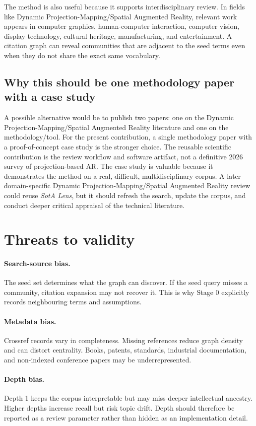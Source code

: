 \documentclass[11pt,a4paper]{article}
\newcommand{\tool}{\emph{SotA Lens}}
\newcommand{\dpm}{Dynamic Projection-Mapping}
\newcommand{\sar}{Spatial Augmented Reality}
\begin{document}
The method is also useful because it supports interdisciplinary review. In fields like \dpm{}/\sar{}, relevant work appears in computer graphics, human-computer interaction, computer vision, display technology, cultural heritage, manufacturing, and entertainment. A citation graph can reveal communities that are adjacent to the seed terms even when they do not share the exact same vocabulary.

\subsection{Why this should be one methodology paper with a case study}

A possible alternative would be to publish two papers: one on the \dpm{}/\sar{} literature and one on the methodology/tool. For the present contribution, a single methodology paper with a proof-of-concept case study is the stronger choice. The reusable scientific contribution is the review workflow and software artifact, not a definitive 2026 survey of projection-based AR. The case study is valuable because it demonstrates the method on a real, difficult, multidisciplinary corpus. A later domain-specific \dpm{}/\sar{} review could reuse \tool{}, but it should refresh the search, update the corpus, and conduct deeper critical appraisal of the technical literature.

\section{Threats to validity}

\paragraph{Search-source bias.}
The seed set determines what the graph can discover. If the seed query misses a community, citation expansion may not recover it. This is why Stage 0 explicitly records neighbouring terms and assumptions.

\paragraph{Metadata bias.}
Crossref records vary in completeness. Missing references reduce graph density and can distort centrality. Books, patents, standards, industrial documentation, and non-indexed conference papers may be underrepresented.

\paragraph{Depth bias.}
Depth 1 keeps the corpus interpretable but may miss deeper intellectual ancestry. Higher depths increase recall but risk topic drift. Depth should therefore be reported as a review parameter rather than hidden as an implementation detail.
\end{document}
